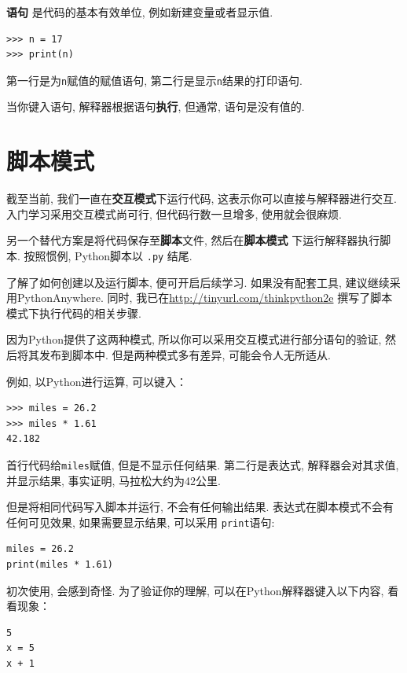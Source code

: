 \documentclass[10pt]{book}
\begin{document}
 {\bf 语句} 是代码的基本有效单位, 例如新建变量或者显示值. 

\begin{verbatim}
>>> n = 17
>>> print(n)
\end{verbatim}
%
第一行是为{\tt n}赋值的赋值语句, 第二行是显示{\tt n}结果的打印语句. 

当你键入语句, 解释器根据语句{\bf 执行}, 但通常, 语句是没有值的. 


\section{脚本模式}

截至当前, 我们一直在{\bf 交互模式}下运行代码, 
这表示你可以直接与解释器进行交互.
入门学习采用交互模式尚可行, 
但代码行数一旦增多, 使用就会很麻烦. 

另一个替代方案是将代码保存至{\bf 脚本}文件, 然后在{\bf 脚本模式}
下运行解释器执行脚本. 按照惯例, Python脚本以 {\tt .py} 结尾. 

了解了如何创建以及运行脚本, 便可开启后续学习. 
如果没有配套工具, 建议继续采用PythonAnywhere. 
同时, 我已在\url{http://tinyurl.com/thinkpython2e}
撰写了脚本模式下执行代码的相关步骤. 

因为Python提供了这两种模式,  
所以你可以采用交互模式进行部分语句的验证,
然后将其发布到脚本中. 
但是两种模式多有差异, 可能会令人无所适从. 

例如, 以Python进行运算, 可以键入：

\begin{verbatim}
>>> miles = 26.2
>>> miles * 1.61
42.182
\end{verbatim}

首行代码给{\tt miles}赋值, 但是不显示任何结果. 
第二行是表达式, 解释器会对其求值, 并显示结果, 
事实证明, 马拉松大约为42公里. 

但是将相同代码写入脚本并运行, 不会有任何输出结果. 
表达式在脚本模式不会有任何可见效果, 如果需要显示结果, 
可以采用 {\tt print}语句: 

\begin{verbatim}
miles = 26.2
print(miles * 1.61)
\end{verbatim}

初次使用, 会感到奇怪. 为了验证你的理解, 
可以在Python解释器键入以下内容, 看看现象：

\begin{verbatim}
5
x = 5
x + 1
\end{verbatim}
\end{document}
